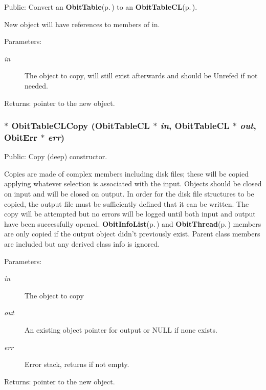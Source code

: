 Public: Convert an {\bf Obit\-Table}{\rm (p.\,\pageref{structObitTable})} to an {\bf Obit\-Table\-CL}{\rm (p.\,\pageref{structObitTableCL})}. 

New object will have references to members of in. \begin{Desc}
\item[Parameters:]
\begin{description}
\item[{\em in}]The object to copy, will still exist afterwards and should be Unrefed if not needed. \end{description}
\end{Desc}
\begin{Desc}
\item[Returns:]pointer to the new object. \end{Desc}
\subsubsection{$\ast$ Obit\-Table\-CLCopy ({\bf Obit\-Table\-CL} $\ast$ {\em in}, {\bf Obit\-Table\-CL} $\ast$ {\em out}, {\bf Obit\-Err} $\ast$ {\em err})}\label{ObitTableCL_8h_a14}


Public: Copy (deep) constructor. 

Copies are made of complex members including disk files; these will be copied applying whatever selection is associated with the input. Objects should be closed on input and will be closed on output. In order for the disk file structures to be copied, the output file must be sufficiently defined that it can be written. The copy will be attempted but no errors will be logged until both input and output have been successfully opened. {\bf Obit\-Info\-List}{\rm (p.\,\pageref{structObitInfoList})} and {\bf Obit\-Thread}{\rm (p.\,\pageref{structObitThread})} members are only copied if the output object didn't previously exist. Parent class members are included but any derived class info is ignored. \begin{Desc}
\item[Parameters:]
\begin{description}
\item[{\em in}]The object to copy \item[{\em out}]An existing object pointer for output or NULL if none exists. \item[{\em err}]Error stack, returns if not empty. \end{description}
\end{Desc}
\begin{Desc}
\item[Returns:]pointer to the new object. \end{Desc}
